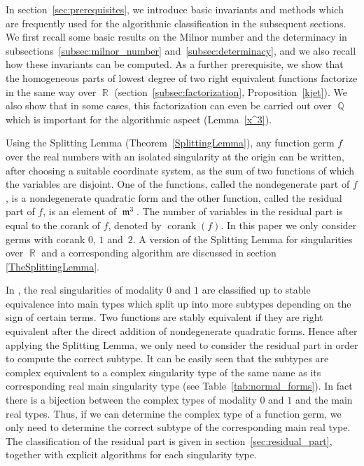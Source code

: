 \documentclass[noend]{amsproc}
\theoremstyle{definition}
\DeclareMathOperator{\m}{\mathfrak{m}}
\DeclareMathOperator{\corank}{corank}
\DeclareMathOperator{\Q}{\mathbb{Q}}
\DeclareMathOperator{\R}{\mathbb{R}}
\begin{document}
In section~\ref{sec:prerequisites}, we introduce basic invariants and methods
which are frequently used for the algorithmic classification in the subsequent
sections. We first recall some basic results on the Milnor number and the
determinacy in subsections~\ref{subsec:milnor_number}
and~\ref{subsec:determinacy}, and we also recall how these invariants
can be computed. As a further prerequisite, we show that the homogeneous parts
of lowest degree of two right equivalent functions factorize in the same way
over $\R$ (section~\ref{subsec:factorization}, Proposition~\ref{kjet}). We also
show that in some cases, this factorization can even be carried out over $\Q$
which is important for the algorithmic aspect (Lemma~\ref{x^3}).

Using the Splitting Lemma (Theorem~\ref{SplittingLemma}), any function germ $f$
over the real numbers with an isolated singularity at the origin can be
written, after choosing a suitable coordinate system, as the sum of two
functions of which the variables are disjoint. One of the functions, called the
nondegenerate part of $f$, is a nondegenerate quadratic form and the other
function, called the residual part of $f$, is an element of $\m^3$. The number
of variables in the residual part is equal to the corank of $f$, denoted by
$\corank(f)$. In this paper we only consider germs with corank $0$, $1$
and~$2$. A version of the Splitting Lemma for singularities over $\R$ and a
corresponding algorithm are discussed in section \ref{TheSplittingLemma}.

In \citet{AVG1985}, the real singularities of modality $0$ and $1$ are
classified up to stable equivalence into main types which split up into more
subtypes
depending on the sign of certain terms. Two functions are stably equivalent if
they are right equivalent after the direct addition of nondegenerate quadratic
forms. Hence after applying the Splitting Lemma, we only need to consider the
residual part in order to compute the correct subtype. It can be easily seen
that the subtypes are complex equivalent to a complex singularity type of the
same name as its corresponding real main singularity type (see
Table~\ref{tab:normal_forms}). In fact there is a bijection between the complex
types of modality $0$ and $1$ and the main real types. Thus, if we can
determine the complex type of a function germ, we only need to determine the
correct subtype of the corresponding main real type. The classification of the
residual part is given in section~\ref{sec:residual_part}, together with
explicit algorithms for each singularity type.
\end{document}
